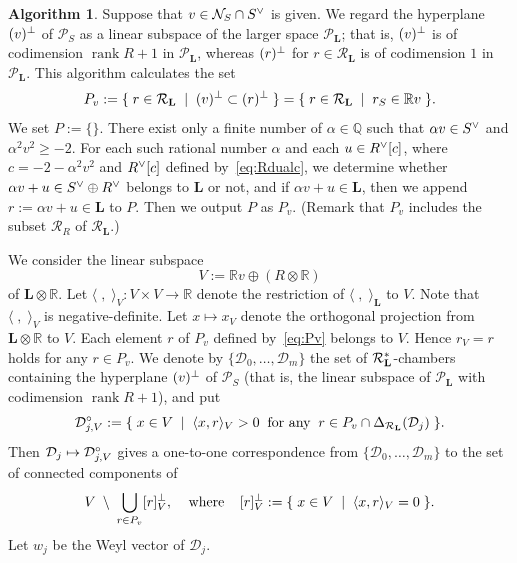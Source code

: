 \documentclass{amsart}
\theoremstyle{plain}
\theoremstyle{definition}
\newtheorem{algorithm}[theorem]{Algorithm}
\theoremstyle{remark}
\numberwithin{equation}{section}
\numberwithin{table}{section}
\numberwithin{figure}{section}
\newcommand{\Q}{\mathord{\mathbb  Q}}
\newcommand{\R}{\mathord{\mathbb R}}
\newcommand{\DDD}{\mathord{\mathcal D}}
\newcommand{\NNN}{\mathord{\mathcal N}}
\newcommand{\PPP}{\mathord{\mathcal P}}
\newcommand{\RRR}{\mathord{\mathcal R}}
\newcommand{\set}[2]{\{\; {#1} \; \mid \; {#2} \;  \}}
\newcommand{\tensor}{\otimes}
\newcommand{\spcirc}{\sp{\mathord{\circ}}}
\newcommand{\sperp}{\sp{\perp}}
\newcommand{\dual}{\sp{\vee}}
\newcommand{\rank}{\operatorname{\mathrm {rank}}\nolimits}
\renewcommand{\L}{\mathord{\mathbf{L}}}
\newcommand{\intM}[2]{\langle{#1}\rangle_{#2}}
\newcommand{\Roots}{\RRR}
\newcommand{\sphyp}{\sp*}
\begin{document}
\begin{algorithm}\label{algorithm:passing}
Suppose that $v\in \NNN_S\cap S\dual$ is given.
We regard the hyperplane $(v)\sperp$ of $\PPP_S$ as a linear subspace of the larger space $\PPP_{\L}$;
that is, 
$(v)\sperp$  is of codimension 
$\rank R+1$ in $\PPP_{\L}$, whereas $(r)\sperp$ for $r\in \Roots_{\L}$ is of codimension $1$ in $\PPP_{\L}$.
This algorithm calculates the set 
%
%
\begin{equation}\label{eq:Pv}
P_v:=\set{r\in \Roots_{\L}}{(v)\sperp\subset (r)\sperp}=\set{r\in \Roots_{\L}}{r_S\in \R v}.
\end{equation}
%
%
We set $P:=\{\}$.
There exist only a finite number of 
$\alpha\in \Q$ such that
$\alpha v \in S\dual$ and $\alpha^2 v^2\ge -2$.
For each such rational number $\alpha$
and
each $u\in R\dual[c]$, where   $c=-2-\alpha^2 v^2$
and $R\dual[c]$ defined by~\eqref{eq:Rdualc},
we determine whether $\alpha v+u\in S\dual\oplus R\dual$ belongs to ${\L}$ or not,
and if  $\alpha v+u\in {\L}$,
then we append $r:=\alpha v+u\in {\L}$ to $P$.
Then we output $P$ as $P_v$.
(Remark that $P_v$ includes the subset  $\Roots_{R}$ of $\Roots_{\L}$.)
\end{algorithm}
%
%
We consider the linear subspace
$$
V:=\R v\oplus (R\tensor \R)
$$
of $\L\tensor\R$.
Let $\intM{\phantom{|}, \phantom{|}}{V}\colon V\times V\to \R$ denote 
the restriction of $\intM{\phantom{|}, \phantom{|}}{\L}$ to $V$.
Note that $\intM{\phantom{|}, \phantom{|}}{V}$ is negative-definite.
Let 
$x\mapsto x_V$ 
denote the orthogonal projection from ${\L}\tensor \R$ to $V$.
Each element $r$ of $P_v$ defined by~\eqref{eq:Pv} belongs to $V$.
Hence $r_V=r$ holds for any $r\in P_v$.
We denote by $\{\DDD_0, \dots, \DDD_m\}$
the set of  $\Roots_{\L}\sphyp$-chambers containing 
the hyperplane $(v)\sperp$ of $\PPP_S$ 
(that is, 
the linear subspace  of $\PPP_{\L}$
with codimension $\rank R+1$), 
and  put
$$
\DDD\spcirc_{j, V}:=
\set{x\in V}{\intM{x, r}{V}>0 \;\;\textrm{for any}\;\; r \in P_v\cap \Delta_{\Roots_{\L}}(\DDD_j)}.
$$
Then $\DDD_j\mapsto \DDD\spcirc_{j, V}$ gives
a one-to-one correspondence
from $\{\DDD_0, \dots, \DDD_m\}$ 
to the set of connected components
of
$$
V\;\setminus\; \bigcup_{r \in P_v}[r]\sperp_V, 
\;\;\;\;\textrm{where}\;\;\;\;
[r]_V\sperp:=\set{x\in V}{\intM{x, r}{V}=0}.
$$
Let $w_j$ be the Weyl vector of $\DDD_j$.
\end{document}
